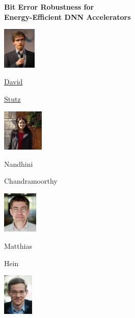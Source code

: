 \documentclass[64pt]{beamer}
\begin{document}
	\begingroup
	\begin{frame}
		\begin{center}  
			{\huge\bfseries Bit Error Robustness for\\[12px] Energy-Efficient DNN Accelerators}
			\vskip 0.75cm
			
			\begin{center}
				\begin{minipage}{0.225\textwidth}
					\centering
					\includegraphics[height=2cm]{gfx/profilepicture}
						
					\footnotesize
					
					\underline{David}
					
					\underline{Stutz}
				\end{minipage}
				\begin{minipage}{0.225\textwidth}
					\centering
					\includegraphics[height=2cm,trim={0.5cm 0 1.25cm 0}, clip]{gfx/nandhinichandramoorthy}
						
					\footnotesize
					
					Nandhini
					
					Chandramoorthy
				\end{minipage}
				\begin{minipage}{0.225\textwidth}
					\centering
					\includegraphics[height=2cm,trim={0.1cm 0 0.15cm 0}, clip]{gfx/matthiashein}
					
					\footnotesize
					
					Matthias
					
					Hein
				\end{minipage}
				\begin{minipage}{0.225\textwidth}
					\centering
					\includegraphics[height=2cm]{gfx/berntschiele}
					

\end{minipage}
\end{center}
\end{center}
\end{frame}
\end{document}
